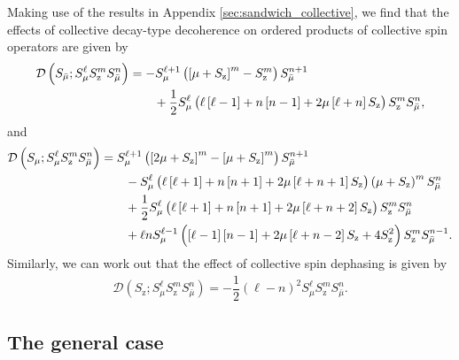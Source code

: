 \documentclass[aps,notitlepage,nofootinbib,11pt]{revtex4-1}
\newcommand{\f}[2]{\dfrac{#1}{#2}} %
\newcommand{\p}[1]{\left(#1\right)} %
\renewcommand{\sp}[1]{\left[#1\right]} %
\newcommand{\D}{\mathcal{D}}
\newcommand{\z}{\text{z}}
\newcommand{\bmu}{{\bar\mu}}
\newcommand{\1}{\mathds{1}}
\begin{document}
Making use of the results in Appendix \ref{sec:sandwich_collective},
we find that the effects of collective decay-type decoherence on
ordered products of collective spin operators are given by
\begin{align}
  \D\p{S_\bmu; S_\mu^\ell S_\z^m S_\bmu^n}
  &= -S_\mu^{\ell+1} \p{\sp{\mu+S_\z}^m - S_\z^m} S_\bmu^{n+1} \notag \\
  &\qquad + \f12 S_\mu^\ell \p{\ell\sp{\ell-1} + n\sp{n-1}
    + 2\mu\sp{\ell+n} S_\z} S_\z^m S_\bmu^n,
\end{align}
and
\begin{align}
  \D\p{S_\mu; S_\mu^\ell S_\z^m S_\bmu^n}
  &= S_\mu^{\ell+1} \p{\sp{2\mu + S_\z}^m-\sp{\mu + S_\z}^m}
  S_\bmu^{n+1} \notag \\
  &\qquad - S_\mu^\ell
  \p{\ell\sp{\ell+1} + n\sp{n+1}+2\mu\sp{\ell+n+1} S_\z}
  \p{\mu+S_\z}^m S_\bmu^n \notag \\
  &\qquad + \f12 S_\mu^\ell
  \p{\ell\sp{\ell+1} + n\sp{n+1}+2\mu\sp{\ell+n+2} S_\z}
  S_\z^m S_\bmu^n \notag \\
  &\qquad + \ell n S_\mu^{\ell-1}
  \p{\sp{\ell-1}\sp{n-1}+2\mu\sp{\ell+n-2} S_\z + 4 S_\z^2}
  S_\z^m S_\bmu^{n-1}.
\end{align}
Similarly, we can work out that the effect of collective spin
dephasing is given by
\begin{align}
  \D\p{S_\z; S_\mu^\ell S_\z^m S_\bmu^n}
  = -\f12 \p{\ell-n}^2 S_\mu^\ell S_\z^m S_\bmu^n.
\end{align}

\subsection{The general case}
\label{sec:general_collective}
\end{document}
